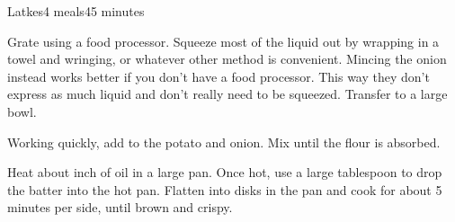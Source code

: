 \documentclass[../Cookbook.tex]{subfiles}
\begin{document}
\begin{recipe}[Latke]{Latkes}{4 meals}{45 minutes}

Grate using a food processor. Squeeze most of the liquid out by wrapping in a towel and wringing, or whatever other method is convenient.
Mincing the onion instead works better if you don't have a food processor. This way they don't express as much liquid and don't really need to be squeezed.
Transfer to a large bowl.

Working quickly, add to the potato and onion. Mix until the flour is absorbed.

Heat about  inch of oil in a large pan. Once hot, use a large tablespoon to drop the batter into the hot pan. Flatten into disks in the pan and cook for about 5 minutes per side, until brown and crispy.

\end{recipe}
\end{document}
